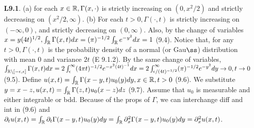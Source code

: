 {\bf L9.1}. (a) for each $x \in \mathbb{R}, \Gamma(x, \cdot)$ is strictly increasing on $(0, x^2/2)$ and strictly decreasing on $(x^2/2, \infty)$. (b) For each $t > 0, \Gamma(\cdot, t)$ is strictly increasing on $(-\infty, 0)$, and strictly decreasing on $(0, \infty)$. 
Also, by the change of variables $x = y(4t)^{1/2}, \int_{\mathbb{R}} \Gamma(x,t)dx = (\pi)^{-1/2} \int_{\mathbb{R}}e^{-y^2}dx = 1$ (9.4). Notice that, for any $t > 0, \Gamma (\cdot, t)$ is the probability density of a normal (or Gau$\ss$) distribution with mean 0 and variance $2t$ (E 9.1.2). By the same change of variables, $\int_{\mathbb{R} \setminus[-\epsilon, \epsilon]} \Gamma(x,t)dx = 2 \int_{\epsilon}^{\infty} (4 \pi t)^{-1/2} e^{-x^2(4t)^{-1}} dx = 2 \int_{\epsilon/(4t)^{-1/2}}^{\infty}(\pi)^{-1/2}e^{-y^2} dy \rightarrow 0, t \rightarrow 0$ (9.5). Define $u(x,t) = \int_{\mathbb{R}} \Gamma(x-y,t)u_0(y)dy, x \in \mathbb{R}, t>0$ (9.6). We substitute $y=x-z, u(x,t)= \int_{\mathbb{R}} \Gamma (z,t)u_0(x-z)dz$ (9.7). Assume that $u_0$ is measurable and either integrable or bdd.  Because of the props of $\Gamma$, we can interchange diff and int in (9.6) and $\partial_t u(x,t) = \int_{\mathbb{R}} \partial_t \Gamma (x-y,t) u_0(y)dy = \int_{\mathbb{R}} \partial_x^2 \Gamma(x-y,t)u_0(y)dy = \partial_x^2 u(x,t)$. 
